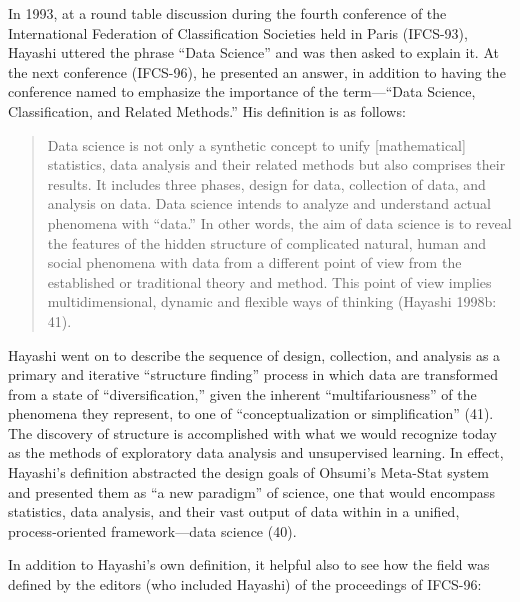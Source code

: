 \documentclass[
  letterpaper,
]{report}
\begin{document}
In 1993, at a round table discussion during the fourth conference of the
International Federation of Classification Societies held in Paris
(IFCS-93), Hayashi uttered the phrase ``Data Science'' and was then
asked to explain it. At the next conference (IFCS-96), he presented an
answer, in addition to having the conference named to emphasize the
importance of the term---``Data Science, Classification, and Related
Methods.'' His definition is as follows:

\begin{quote}
Data science is not only a synthetic concept to unify {[}mathematical{]}
statistics, data analysis and their related methods but also comprises
their results. It includes three phases, design for data, collection of
data, and analysis on data. Data science intends to analyze and
understand actual phenomena with ``data.'' In other words, the aim of
data science is to reveal the features of the hidden structure of
complicated natural, human and social phenomena with data from a
different point of view from the established or traditional theory and
method. This point of view implies multidimensional, dynamic and
flexible ways of thinking (Hayashi 1998b: 41).
\end{quote}

Hayashi went on to describe the sequence of design, collection, and
analysis as a primary and iterative ``structure finding'' process in
which data are transformed from a state of ``diversification,'' given
the inherent ``multifariousness'' of the phenomena they represent, to
one of ``conceptualization or simplification'' (41). The discovery of
structure is accomplished with what we would recognize today as the
methods of exploratory data analysis and unsupervised learning. In
effect, Hayashi's definition abstracted the design goals of Ohsumi's
Meta-Stat system and presented them as ``a new paradigm'' of science,
one that would encompass statistics, data analysis, and their vast
output of data within in a unified, process-oriented framework---data
science (40).

In addition to Hayashi's own definition, it helpful also to see how the
field was defined by the editors (who included Hayashi) of the
proceedings of IFCS-96:
\end{document}
